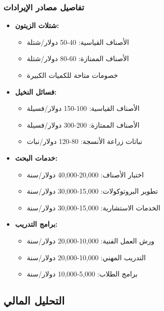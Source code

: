 \subsubsection{تفاصيل مصادر الإيرادات}
\begin{itemize}
    \item \textbf{شتلات الزيتون:}
    \begin{itemize}
        \item الأصناف القياسية: 40-50 دولار/شتلة
        \item الأصناف الممتازة: 60-80 دولار/شتلة
        \item خصومات متاحة للكميات الكبيرة
    \end{itemize}
    
    \item \textbf{فسائل النخيل:}
    \begin{itemize}
        \item الأصناف القياسية: 100-150 دولار/فسيلة
        \item الأصناف الممتازة: 200-300 دولار/فسيلة
        \item نباتات زراعة الأنسجة: 80-120 دولار/نبات
    \end{itemize}
    
    \item \textbf{خدمات البحث:}
    \begin{itemize}
        \item اختبار الأصناف: 20,000-40,000 دولار/سنة
        \item تطوير البروتوكولات: 15,000-30,000 دولار/سنة
        \item الخدمات الاستشارية: 15,000-30,000 دولار/سنة
    \end{itemize}
    
    \item \textbf{برامج التدريب:}
    \begin{itemize}
        \item ورش العمل الفنية: 10,000-20,000 دولار/سنة
        \item التدريب المهني: 10,000-20,000 دولار/سنة
        \item برامج الطلاب: 5,000-10,000 دولار/سنة
    \end{itemize}
\end{itemize}

\subsection{التحليل المالي}

